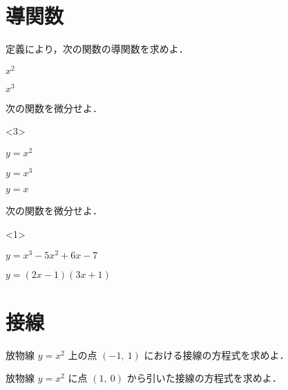 \documentclass[fleqn]{jarticle}
\newenvironment{mon}{ \begin{mondai}}{%
  \end{mondai}}%
\begin{document}
\openrensyuuFile%
\openmondaiFile%
\openhattenFile%
\section{導関数}
\begin{rensyuu}
    定義により，次の関数の導関数を求めよ．%
    \kaitou{}%
    \begin{edaenumerate}
      \item $x^2$
      \item $x^3$
    \end{edaenumerate}
\end{rensyuu}
\begin{mon}
  次の関数を微分せよ．\kaitou{}%
  \begin{edaenumerate}<3>
    \item $y=x^2$
    \item $y=x^3$
    \item $y=x$
  \end{edaenumerate}
\end{mon}
\begin{rensyuu}
    次の関数を微分せよ．\kaitou{}
    \begin{edaenumerate}<1>
    \item $y=x^3-5x^2+6x-7$
    \item $y=(2x-1)(3x+1)$
    \end{edaenumerate}
\end{rensyuu}
\section{接線}
\begin{mon}
  放物線 $y=x^2$ 上の点 $(-1,~1)$ における接線の方程式を求めよ．
\end{mon}

\begin{rensyuu}
  放物線 $y=x^2$ に点 $(1,~0)$ から引いた接線の方程式を求めよ．
\end{rensyuu}
\vspace{\baselineskip}
\end{document}
